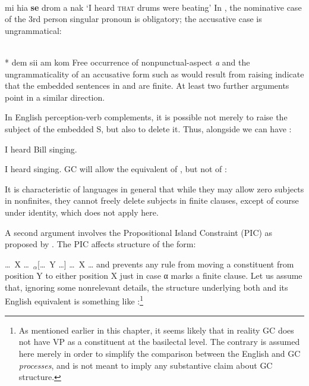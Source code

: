 \ea\label{ex:2:134}
\\
mi hia \textbf{se} drom a nak
\glt `I heard {\scshape that} drums were beating'
\z{}
In , the nominative case of the 3rd person singular pronoun is obligatory; the accusative case is ungrammatical:

\ea\label{ex:2:135}
\\
\textnormal{*} dem sii am kom
\z
Free occurrence of nonpunctual-aspect \textit{a} and the ungrammaticality of an accusative form such as would result from raising indicate that the embedded sentences in  and  are finite. At least two further arguments point in a similar direction.

In English perception-verb complements, it is possible not merely to raise the subject of the embedded S, but also to delete it. Thus, alongside  we can have :

\ea\label{ex:2:136}I heard Bill singing.\z

\ea\label{ex:2:137}I heard singing.\z
GC will allow the equivalent of , but not of :

\z

\z
It is characteristic of languages in general that while they may allow zero subjects in nonfinites, they cannot freely delete subjects in finite clauses, except of course under identity, which does not apply here.

A second argument involves the Propositional Island Constraint (PIC) as proposed by \citet{Chomsky1977}. The PIC affects structure of the form:

\ea\label{ex:2:140}\ldots~X \ldots~$_{\alpha}$[\ldots~Y \ldots] \ldots~X \ldots \z
and prevents any rule from moving a constituent from position Y to either position X just in case α marks a finite clause. Let us assume that, ignoring some nonrelevant details, the structure underlying both  and its English equivalent is something like :\footnote{As mentioned earlier in this chapter, it seems likely that in reality GC does not have VP as a constituent at the basilectal level. The contrary is assumed here merely in order to simplify the comparison between the English and GC \textit{processes}, and is not meant to imply any substantive claim about GC structure.}

